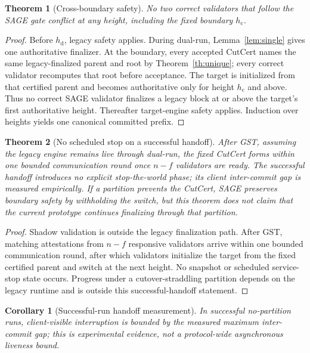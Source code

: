 \documentclass[journal]{IEEEtran}
\newtheorem{theorem}{Theorem}
\newtheorem{corollary}{Corollary}
\theoremstyle{definition}
\theoremstyle{remark}
\begin{document}
\begin{theorem}[Cross-boundary safety]
\label{th:safety}
No two correct validators that follow the SAGE gate conflict at any height, including the fixed
boundary $h_{\mathrm{c}}$.
\end{theorem}
\begin{proof}
Before $h_{\mathrm{d}}$, legacy safety applies. During dual-run, Lemma~\ref{lem:single} gives one
authoritative finalizer. At the boundary, every accepted CutCert names the same legacy-finalized
parent and root by Theorem~\ref{th:unique}; every correct validator recomputes that root before
acceptance. The target is initialized from that certified parent and becomes authoritative only for
height $h_{\mathrm{c}}$ and above. Thus no correct SAGE validator finalizes a legacy block at or above
the target's first authoritative height. Thereafter target-engine safety applies. Induction over
heights yields one canonical committed prefix.
\end{proof}

\begin{theorem}[No scheduled stop on a successful handoff]
\label{th:liveness}
After GST, assuming the legacy engine remains live through dual-run, the fixed CutCert forms within
one bounded communication round once $n-f$ validators are ready. The successful handoff introduces
no explicit stop-the-world phase; its client inter-commit gap is measured empirically. If a
partition prevents the CutCert, SAGE preserves boundary safety by withholding the switch, but this
theorem does not claim that the current prototype continues finalizing through that partition.
\end{theorem}
\begin{proof}
Shadow validation is outside the legacy finalization path. After GST, matching attestations from
$n-f$ responsive validators arrive within one bounded communication round, after which validators
initialize the target from the fixed certified parent and switch at the next height. No snapshot or
scheduled service-stop state occurs. Progress under a cutover-straddling partition depends on the
legacy runtime and is outside this successful-handoff statement.
\end{proof}

\begin{corollary}[Successful-run handoff measurement]
\label{cor:nohalt}
In successful no-partition runs, client-visible interruption is bounded by the measured maximum
inter-commit gap; this is experimental evidence, not a protocol-wide asynchronous liveness bound.
\end{corollary}
\end{document}
